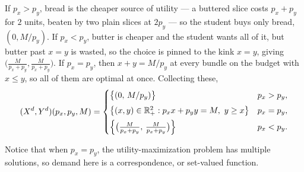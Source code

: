 \documentclass[11pt]{article}
\begin{document}
If $p_x>p_y$, bread is the cheaper source of utility --- a buttered slice costs $p_x+p_y$ for $2$ units, beaten by two plain slices at $2p_y$ --- so the student buys only bread, $(0,M/p_y)$. If $p_x<p_y$, butter is cheaper and the student wants all of it, but butter past $x=y$ is wasted, so the choice is pinned to the kink $x=y$, giving $\bigl(\tfrac{M}{p_x+p_y},\tfrac{M}{p_x+p_y}\bigr)$. If $p_x=p_y$, then $x+y=M/p_y$ at every bundle on the budget with $x\le y$, so all of them are optimal at once. Collecting these,
\[
  (X^d,Y^d)(p_x,p_y,M)=
  \begin{cases}
    \bigl\{(0,\,M/p_y)\bigr\} & p_x>p_y,\\[4pt]
    \bigl\{(x,y)\in\mathbb{R}^2_+ : p_x x+p_y y=M,\ y\ge x\bigr\} & p_x=p_y,\\[4pt]
    \Bigl\{\bigl(\tfrac{M}{p_x+p_y},\,\tfrac{M}{p_x+p_y}\bigr)\Bigr\} & p_x<p_y.
  \end{cases}
\]

Notice that when $p_x=p_y$, the utility-maximization problem has multiple solutions, so demand here is a correspondence, or set-valued function.
\end{document}
